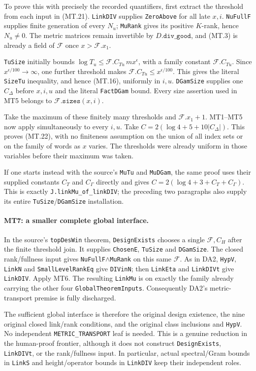 To prove this with precisely the recorded quantifiers, first extract the
threshold from each input in (MT.21).  \texttt{LinkDIV} supplies
\texttt{ZeroAbove} for all late $x,i$.  \texttt{NuFullF} supplies finite
generation of every $N_u$; \texttt{MuRank} gives its positive $K$-rank,
hence $N_u\ne0$.  The metric matrices remain invertible by
$D.\texttt{div\_good}$, and (MT.3) is already a field of
$\mathcal F$ once $x>\mathcal F.x_1$.

\texttt{TuSize} initially bounds
$\log T_u\le\mathcal F.C_{Tu}\,m x^\epsilon$, with a family
constant $\mathcal F.C_{Tu}$.  Since $x^{\epsilon/100}\to\infty$,
one further threshold makes
$\mathcal F.C_{Tu}\le x^{\epsilon/100}$.  This gives the literal
\texttt{SizeTu} inequality, and hence (MT.16), uniformly in $i,u$.
\texttt{DGamSize} supplies one $C_\Delta$ before $x,i,u$ and the
literal \texttt{FactDGam} bound.  Every size assertion used in MT5
belongs to $\mathcal F.\texttt{sizes}(x,i)$.

Take the maximum of these finitely many thresholds and
$\mathcal F.x_1+1$.  MT1--MT5 now apply simultaneously to every $i,u$.
Take $C=2(\log4+5+10|C_\Delta|)$.  This proves (MT.22), with no
finiteness assumption on the union of all index sets or on the family
of words as $x$ varies.  The thresholds were already uniform in those
variables before their maximum was taken.

If one starts instead with the source's \texttt{MuTu} and
\texttt{MuDGam}, the same proof uses their supplied constants $C_T$
and $C_\Gamma$ directly and gives
$C=2(\log4+3+C_T+C_\Gamma)$.  This is exactly
\texttt{J.linkMu\_of\_linkDIV}; the preceding two paragraphs also
supply its entire \texttt{TuSize}/\texttt{DGamSize} installation.

\paragraph{MT7: a smaller complete global interface.}
\label{claim:MT7}
In the source's \texttt{topDesWin} theorem, \texttt{DesignExists}
chooses a single $\mathcal F,C_H$ after the finite threshold join.
It supplies \texttt{ChosenE}, \texttt{TuSize} and \texttt{DGamSize}.
The closed rank/fullness input gives
\texttt{NuFullF}$\wedge$\texttt{MuRank} on this same $\mathcal F$.
As in DA2, \texttt{HypV}, \texttt{LinkN} and
\texttt{SmallLevelRankEq} give \texttt{DIVinN}; then
\texttt{LinkEta} and \texttt{LinkDIVt} give \texttt{LinkDIV}.
Apply MT6.  The resulting \texttt{LinkMu} is on exactly the family
already carrying the other four \texttt{GlobalTheoremInputs}.
Consequently DA2's metric-transport premise is fully discharged.

The sufficient global interface is therefore the original design
existence, the nine original closed link/rank conditions, and the
original class inclusions and \texttt{HypV}.  No independent
\texttt{METRIC\_TRANSPORT} leaf is needed.  This is a genuine reduction
in the human-proof frontier, although it does not construct
\texttt{DesignExists}, \texttt{LinkDIVt}, or the rank/fullness input.
In particular, actual spectral/Gram bounds in \texttt{LinkS} and
height/operator bounds in \texttt{LinkDIV} keep their independent roles.
